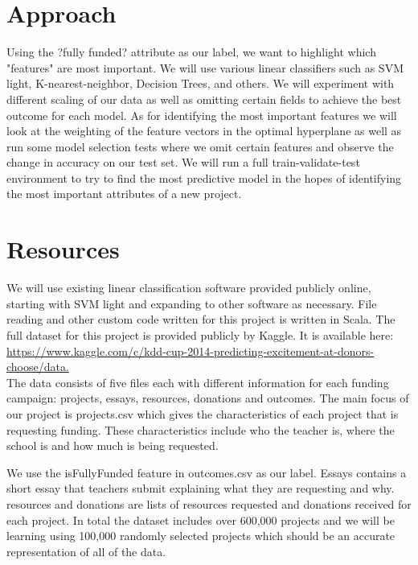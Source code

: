 \documentclass{article}
\begin{document}
\section{Approach}

Using the ?fully funded? attribute as our label, we want to highlight which "features" are most important.  We will use various linear classifiers such as SVM light, K-nearest-neighbor, Decision Trees, and others. We will experiment with different scaling of our data as well as omitting certain fields to achieve the best outcome for each model.  As for identifying the most important features we will look at the weighting of the feature vectors in the optimal hyperplane as well as run some model selection tests where we omit certain features and observe the change in accuracy on our test set. We will run a full train-validate-test environment to try to find the most predictive model in the hopes of identifying the most important attributes of a new project.

\section{Resources}
We will use existing linear classification software provided publicly online, starting with SVM light and expanding to other software as necessary. File reading and other custom code written for this project is written in Scala. The full dataset for this project is provided publicly by Kaggle. It is available here:\\ 

\href{https://www.kaggle.com/c/kdd-cup-2014-predicting-excitement-at-donors-choose/data.}{https://www.kaggle.com/c/kdd-cup-2014-predicting-excitement-at-donors-choose/data.}\\

The data consists of five files each with different information for each funding campaign: projects, essays, resources, donations and outcomes. The main focus of our project is projects.csv which gives the characteristics of each project that is requesting funding. These characteristics include who the teacher is, where the school is and how much is being requested. 

We use the isFullyFunded feature in outcomes.csv as our label. Essays contains a short essay that teachers submit explaining what they are requesting and why. resources and donations are lists of resources requested and donations received for each project. In total the dataset includes over 600,000 projects and we will be learning using 100,000 randomly selected projects which should be an accurate representation of all of the data.
\end{document}
